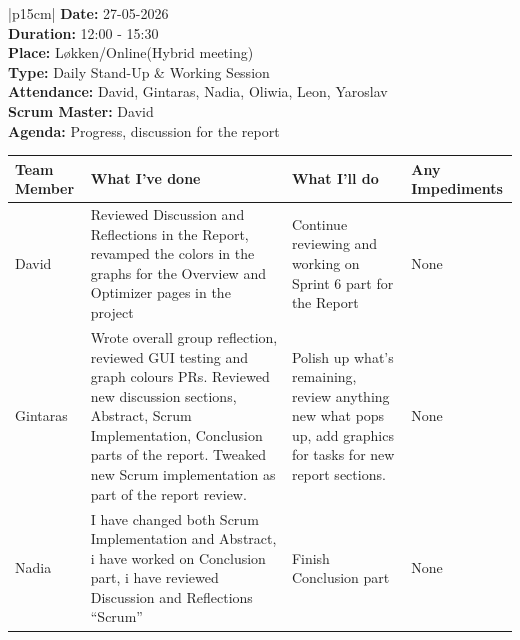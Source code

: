 \begin{table}[H]
    \centering
    \begin{tabular}{|p{15cm}|}   
        \hline
        \textbf{Date:}  27-05-2026 \\
        \textbf{Duration:}  12:00 - 15:30 \\
        \textbf{Place:}  Løkken/Online(Hybrid meeting) \\
        \textbf{Type:} Daily Stand-Up \& Working Session \\
        \textbf{Attendance:} David, Gintaras, Nadia, Oliwia, Leon, Yaroslav \\
        \textbf{Scrum Master:}  David \\
        \textbf{Agenda:} Progress, discussion for the report
        \begin{table}[H]
            \begin{tabular}{|p{1.75cm}|p{4cm}|p{4cm}|p{4cm}|}
                \hline
                \cellcolor[HTML]{BFBFBF}  \textbf{Team Member} & \cellcolor[HTML]{BFBFBF}  \textbf{What I've done} & \cellcolor[HTML]{BFBFBF}  \textbf{What I'll do} & \cellcolor[HTML]{BFBFBF}  \textbf{Any Impediments}\\
                \hline
                \cellcolor[HTML]{d4d4d4} David & Reviewed Discussion and Reflections in the Report, revamped the colors in the graphs for the Overview and Optimizer pages in the project & Continue reviewing and working on Sprint 6 part for the Report & None \\
                \hline
                \cellcolor[HTML]{d4d4d4} Gintaras & Wrote overall group reflection, reviewed GUI testing and graph colours PRs. Reviewed new discussion sections, Abstract, Scrum Implementation, Conclusion parts of the report. Tweaked new Scrum implementation as part of the report review. & Polish up what’s remaining, review anything new what pops up, add graphics for tasks for new report sections. & None \\
                \hline
                \cellcolor[HTML]{d4d4d4} Nadia & I have changed both Scrum Implementation and Abstract, i have worked on Conclusion part, i have reviewed Discussion and Reflections “Scrum” & Finish Conclusion part & None \\
                \hline
            \end{tabular}
        \end{table} \\
        \hline
    \end{tabular}
\end{table}

